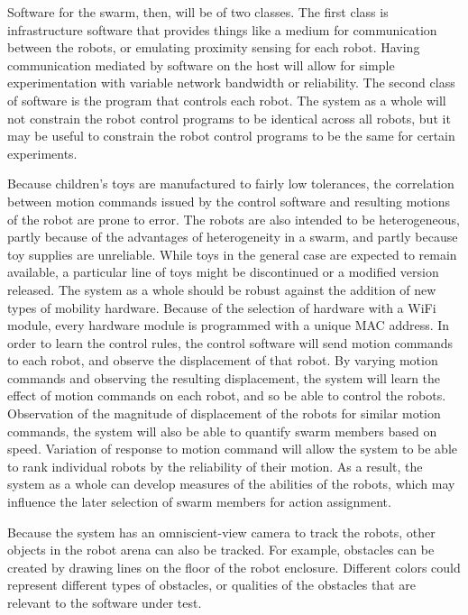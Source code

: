 \documentclass[]{article}
\begin{document}
Software for the swarm, then, will be of two classes. 
The first class is infrastructure software that provides things like a medium for communication between the robots, or emulating proximity sensing for each robot. 
Having communication mediated by software on the host will allow for simple experimentation with variable network bandwidth or reliability. 
The second class of software is the program that controls each robot. 
The system as a whole will not constrain the robot control programs to be identical across all robots, but it may be useful to constrain the robot control programs to be the same for certain experiments. 

Because children's toys are manufactured to fairly low tolerances, the correlation between motion commands issued by the control software and resulting motions of the robot are prone to error. 
The robots are also intended to be heterogeneous, partly because of the advantages of heterogeneity in a swarm, and partly because toy supplies are unreliable.
While toys in the general case are expected to remain available, a particular line of toys might be discontinued or a modified version released. 
The system as a whole should be robust against the addition of new types of mobility hardware. 
Because of the selection of hardware with a WiFi module, every hardware module is programmed with a unique MAC address. 
In order to learn the control rules, the control software will send motion commands to each robot, and observe the displacement of that robot. 
By varying motion commands and observing the resulting displacement, the system will learn the effect of motion commands on each robot, and so be able to control the robots. 
Observation of the magnitude of displacement of the robots for similar motion commands, the system will also be able to quantify swarm members based on speed. 
Variation of response to motion command will allow the system to be able to rank individual robots by the reliability of their motion. 
As a result, the system as a whole can develop measures of the abilities of the robots, which may influence the later selection of swarm members for action assignment. 

Because the system has an omniscient-view camera to track the robots, other objects in the robot arena can also be tracked. 
For example, obstacles can be created by drawing lines on the floor of the robot enclosure. 
Different colors could represent different types of obstacles, or qualities of the obstacles that are relevant to the software under test. 
\end{document}
